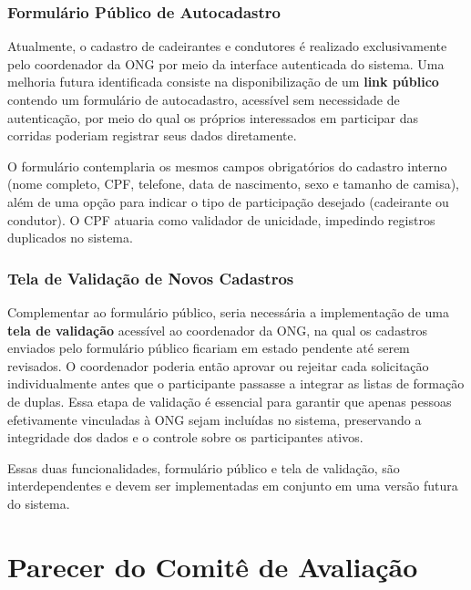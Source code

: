 \documentclass[12pt,a4paper]{article}
\begin{document}
\subsubsection{Formulário Público de Autocadastro}

Atualmente, o cadastro de cadeirantes e condutores é realizado exclusivamente pelo coordenador da ONG por meio da interface autenticada do sistema. Uma melhoria futura identificada consiste na disponibilização de um \textbf{link público} contendo um formulário de autocadastro, acessível sem necessidade de autenticação, por meio do qual os próprios interessados em participar das corridas poderiam registrar seus dados diretamente.

O formulário contemplaria os mesmos campos obrigatórios do cadastro interno (nome completo, CPF, telefone, data de nascimento, sexo e tamanho de camisa), além de uma opção para indicar o tipo de participação desejado (cadeirante ou condutor). O CPF atuaria como validador de unicidade, impedindo registros duplicados no sistema.

\subsubsection{Tela de Validação de Novos Cadastros}

Complementar ao formulário público, seria necessária a implementação de uma \textbf{tela de validação} acessível ao coordenador da ONG, na qual os cadastros enviados pelo formulário público ficariam em estado pendente até serem revisados. O coordenador poderia então aprovar ou rejeitar cada solicitação individualmente antes que o participante passasse a integrar as listas de formação de duplas. Essa etapa de validação é essencial para garantir que apenas pessoas efetivamente vinculadas à ONG sejam incluídas no sistema, preservando a integridade dos dados e o controle sobre os participantes ativos.

Essas duas funcionalidades, formulário público e tela de validação, são interdependentes e devem ser implementadas em conjunto em uma versão futura do sistema.

\newpage
\section{Parecer do Comitê de Avaliação}
 
\end{document}

